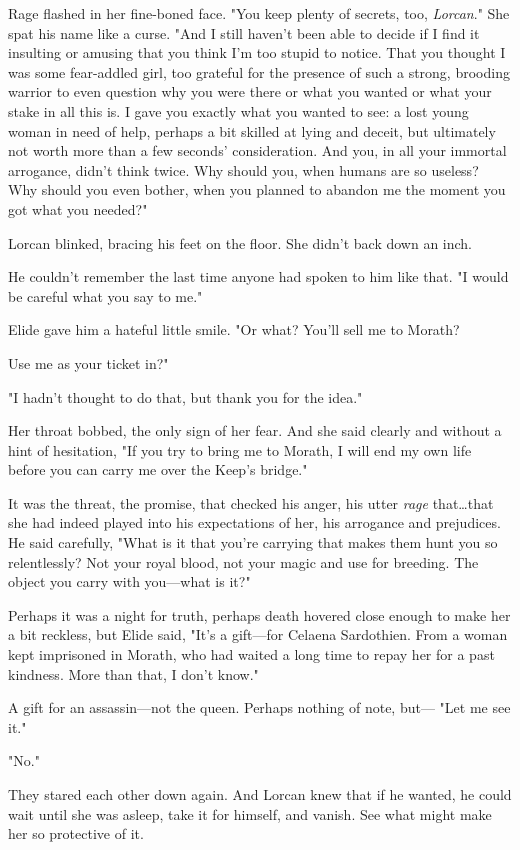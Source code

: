 Rage flashed in her fine-boned face.
"You keep plenty of secrets, too,
\emph{Lorcan}."
She spat his name like a curse.
"And I still haven't been able to decide if I find it insulting or amusing that you think I'm too stupid to notice.
That you thought I was some fear-addled girl, too grateful for the presence of such a strong, brooding warrior to even question why you were there or what you wanted or what your stake in all this is.
I gave you exactly what you wanted to see: a lost young woman in need of help, perhaps a bit skilled at lying and deceit, but ultimately not worth more than a few seconds' consideration.
And you, in all your immortal arrogance, didn't think twice.
Why should you, when humans are so useless?
Why should you even bother, when you planned to abandon me the moment you got what you needed?"

Lorcan blinked, bracing his feet on the floor.
She didn't back down an inch.

He couldn't remember the last time anyone had spoken to him like that.
"I would be careful what you say to me."

Elide gave him a hateful little smile.
"Or what?
You'll sell me to Morath?

Use me as your ticket in?"

"I hadn't thought to do that, but thank you for the idea."

Her throat bobbed, the only sign of her fear.
And she said clearly and without a hint of hesitation, "If you try to bring me to Morath, I will end my own life before you can carry me over the Keep's bridge."

It was the threat, the promise, that checked his anger, his utter \emph{rage} that\ldots that she had indeed played into his expectations of her, his arrogance and prejudices.
He said carefully, "What is it that you're carrying that makes them hunt you so relentlessly?
Not your royal blood, not your magic and use for breeding.
The object you carry with you---what is it?"

Perhaps it was a night for truth, perhaps death hovered close enough to make her a bit reckless, but Elide said, "It's a gift---for Celaena Sardothien.
From a woman kept imprisoned in Morath, who had waited a long time to repay her for a past kindness.
More than that, I don't know."

A gift for an assassin---not the queen.
Perhaps nothing of note, but--- "Let me see it."

"No."

They stared each other down again.
And Lorcan knew that if he wanted, he could wait until she was asleep, take it for himself, and vanish.
See what might make her so protective of it.

